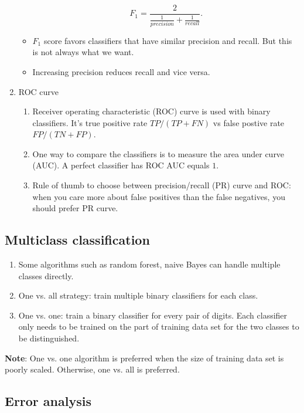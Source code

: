 \documentclass[12pt,oneside,a4paper]{article}
\numberwithin{equation}{section}
\begin{document}
\begin{enumerate}
\begin{itemize}
\begin{equation*}
F_1 = \frac{2}{\frac{1}{precision} + \frac{1}{recall}}.
\end{equation*}

\item $F_1$ score favors classifiers that have similar precision and recall. But this is not always what we want. 

\item Increasing precision reduces recall and vice versa. 
\end{itemize}

\item ROC curve 

\begin{enumerate}
\item Receiver operating characteristic (ROC) curve is used with binary classifiers. It's true positive rate $TP/(TP + FN)$ vs false postive rate $FP/(TN + FP)$.
\item One way to compare the classifiers is to measure the area under curve (AUC). A perfect classifier has ROC AUC equals $1$.

\item Rule of thumb to choose between precision/recall (PR) curve and ROC: when you care more about false positives than the false negatives, you should prefer PR curve. 
\end{enumerate}
\end{enumerate}

\subsection{Multiclass classification}
\begin{enumerate}
\item Some algorithms such as random forest, naive Bayes can handle multiple classes directly. 
\item One vs. all strategy: train multiple binary classifiers for each class. 

\item One vs. one: train a binary classifier for every pair of digits. Each classifier only needs to be trained on the part of training data set for the two classes to be distinguished.
\end{enumerate}

\textbf{Note}: One vs. one algorithm is preferred when the size of training data set is poorly scaled.  Otherwise, one vs. all is preferred. 
\subsection{Error analysis}
\end{document}
